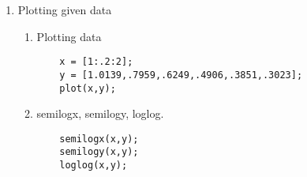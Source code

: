 \documentclass{article}
\begin{document}
\begin{enumerate}
\item Plotting given data
\begin{enumerate}
    \item Plotting data
    \begin{lstlisting}
    x = [1:.2:2];
    y = [1.0139,.7959,.6249,.4906,.3851,.3023];
    plot(x,y);
    \end{lstlisting}
    \item semilogx, semilogy, loglog.\\
    \begin{lstlisting}
    semilogx(x,y);
    semilogy(x,y);
    loglog(x,y);
    \end{lstlisting}
\end{enumerate}
\end{enumerate}
\end{document}
